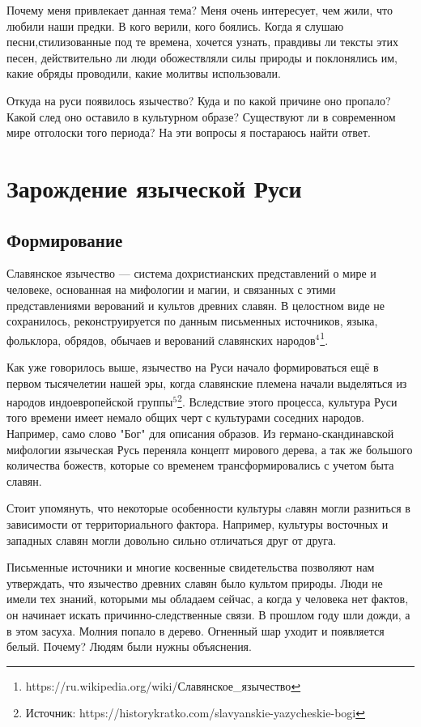 \documentclass[a4paper, 12pt]{report}
\begin{document}
Почему меня привлекает данная тема? Меня очень интересует, чем жили, что любили наши предки. В кого верили, кого боялись. Когда я слушаю песни,стилизованные под те времена, хочется узнать, правдивы ли тексты этих песен, действительно ли люди обожествляли силы природы и поклонялись им, какие обряды проводили, какие молитвы использовали.
   
  Откуда на руси появилось язычество? Куда и по какой причине оно пропало? Какой след оно оставило в культурном образе? Существуют ли в современном мире отголоски того периода?
На эти вопросы я постараюсь найти ответ.




\chapter{Зарождение языческой Руси} 

\section{Формирование}

Славянское язычество — система дохристианских представлений о мире и человеке, основанная на мифологии и магии, и связанных с этими представлениями верований и культов древних славян. В целостном виде не сохранилось, реконструируется по данным письменных источников, языка, фольклора, обрядов, обычаев и верований славянских народов$^4$\footnote{https://ru.wikipedia.org/wiki/Славянское\_язычество}.

Как уже говорилось выше, язычество на Руси начало формироваться ещё в первом тысячелетии нашей эры, когда славянские племена начали выделяться из народов индоевропейской группы$^5$\footnote{Источник: https://historykratko.com/slavyanskie-yazycheskie-bogi}.
Вследствие этого процесса, культура Руси того времени имеет немало общих черт с культурами соседних народов. Например, само слово "Бог" для описания образов.
Из германо-скандинавской мифологии языческая Русь переняла концепт мирового дерева, а так же большого количества божеств, которые со временем трансформировались с учетом быта славян.

Стоит упомянуть, что некоторые особенности культуры cлавян могли разниться в зависимости от территориального фактора. Например, культуры восточных и западных славян могли довольно сильно отличаться друг от друга. 


Письменные источники и многие косвенные свидетельства позволяют
нам утверждать, что язычество древних славян было культом
природы. Люди не имели тех знаний, которыми мы обладаем сейчас, а когда у человека нет фактов, он начинает искать причинно-следственные связи. В прошлом году шли дожди, а в этом засуха. Молния попало в дерево. Огненный шар уходит и появляется белый. Почему? Людям были нужны объяснения. 
\end{document}
